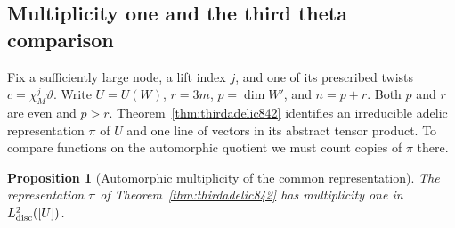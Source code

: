 \documentclass[a4paper,11pt]{article}
\newtheorem{proposition}{Proposition}[section]
\theoremstyle{definition}
\theoremstyle{remark}
\numberwithin{equation}{section}
\begin{document}
\subsection{Multiplicity one and the third theta comparison}
\label{sec:thirdglobal843}
Fix a sufficiently large node, a lift index \(j\), and one of its
prescribed twists \(c=\chi_M^j\vartheta\). Write \(U=U(W)\),
\(r=3m\), \(p=\dim W'\), and \(n=p+r\). Both \(p\) and \(r\) are
even and \(p>r\). Theorem~\ref{thm:thirdadelic842} identifies an
irreducible adelic representation \(\pi\) of \(U\) and one line of
vectors in its abstract tensor product. To compare functions on the
automorphic quotient we must count copies of \(\pi\) there.

\begin{proposition}[Automorphic multiplicity of the common representation]
\leavevmode\label{prop:thirdmultiplicity843}
The representation \(\pi\) of Theorem~\ref{thm:thirdadelic842}
has multiplicity one in \(L^2_{\rm disc}([U])\).
\end{proposition}
\end{document}
